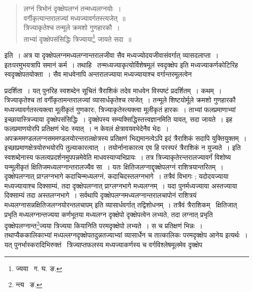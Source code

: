\documentclass[11pt, openany]{book}
\begin{document}
\begin{quote}
{\qt लग्नं त्रिभोनं दृक्क्षेपलग्नं तन्मध्यलग्नयोः~। \\
वर्गीकृत्यान्तरालज्यां मध्यज्यावर्गतस्त्यजेत्~॥ \\
त्रिज्याकृतेश्च तन्मूले क्रमशो गुणहारकौ~। \\
ताभ्यां दृक्क्षेपसंसिद्धिः त्रिज्याया\renewcommand{\thefootnote}{३}\footnote{ज्यया \textendash\ ग. घ. ङ.} जायते सदा~॥ }
\end{quote}

\noindent इति~। अत्र या दृक्क्षेपलग्नमध्यलग्नान्तरालजीवा सैव मध्यज्योदयजीवासंवर्गात् व्यासदलाप्ता~। इतःपरमुभयत्रापि समानं 
कर्म~। तथाहि \textendash\ {\qt तन्मध्यज्याकृत्योर्विशेषमूलं स्वदृक्क्षेप} इति मध्यज्याकर्णकोटिरिह स्वदृक्क्षेपतयोक्ता~। सैव माधवेनापि अन्तरालज्याया मध्यज्यायाश्च वर्गान्तरमूलत्वेन 

\newpage

\noindent प्रदर्शिता~। यत् पुनरिह स्वशब्देन सूचितं त्रैराशिकं तदेव माधवेन विस्पष्टं प्रदर्शितम्~। कथम्~। त्रिज्याकृतेश्च तां वर्गीकृतामन्तरालज्यां व्यासार्धकृतेश्च त्यजेत्~। तन्मूले शिष्टयोर्मूले क्रमशो गुणहारकौ मध्यज्यावर्गतस्त्यक्त्वा मूलीकृतं गुणकारः, त्रिज्याकृतेस्त्यक्त्वा मूलीकृतं हारकः~। ताभ्यां फलप्रमाणाभ्यां इच्छायास्त्रिज्याया दृक्क्षेपसंसिद्धिः~। दृक्क्षेपस्य सम्यक्सिद्धिस्तत्त्वज्ञानमिति यावत्, सदा जायते~। इह फलप्रमाणयोरपि प्रतिक्षणं भेदः स्यात्~। न केवलं क्षेत्रावयवभेदेनैव भेदः~। अपक्रममण्डललग्नसममण्डलयोरन्तरालक्षेत्रस्य प्रतिक्षणं भिद्यमानत्वेऽपि इदं त्रैराशिकं सदापि युक्तियुक्तम्~। इच्छाप्रमाणक्षेत्रयोरुभयोरपि तुल्याकारत्वात्~। तयोर्नानाकारत्व एव हि परस्परं त्रैराशिकं न युज्यते~। इति स्वशब्देनास्य फलत्वप्रदर्शनमुपपन्नमेवेति माधवस्याप्यभिप्रायः~। तत्र त्रिज्याकृतेरन्तरालज्यावर्गं विशोष्य यन्मूलीकृतं क्षितिजमध्यलग्नान्तरालज्यैव सा~। यतः क्षितिजलग्नाद्दृक्क्षेपलग्नं राशित्रयान्तरितम्~। दृक्क्षेपलग्नात् प्राग्लग्नभागे कदाचिन्मध्यलग्नं, कदाचिदस्तलग्नभागे~। तत्रैवं विभागः ; यदोदयज्याया मध्यज्यायाश्च दिक्साम्यं, तदा दृक्क्षेपलग्नात् प्राग्लग्नभागे मध्यलग्नम्~। यदा पुनर्मध्यज्याया अस्तज्याया दिक्साम्यं तदा अस्तलग्नभागे~। सर्वथापि दृक्क्षेपलग्नमध्यलग्नान्तरालचापोनं राशित्रयं मध्यलग्नासन्नक्षितिजलग्नयोरन्तलचापम् इति व्यासार्धवर्गात् तद्विशोधनम्~। तत्रैवं त्रैराशिकम् \textendash\ क्षितिजात् प्रभृति मध्यलग्नान्तज्यया कर्णभूतया मध्यलग्न दृक्क्षेपो दृक्क्षेपत्वेन लभ्यते, तदा लग्नात् प्रभृति दृक्क्षेपलग्नान्त\renewcommand{\thefootnote}{१}\footnote{न्त्य \textendash\ ङ.}ज्यया त्रिज्यया कियानिति परमदृक्क्षेपो लभ्यते~। स च प्रतिक्षणं भिन्नः~। तथाप्यैककालिकाभ्यां मध्पल्लग्नदृक्क्षेपतदुन्नतज्याभ्यां व्यासार्धेन च तात्कालिकः परमदृक्क्षेप आनेय इत्यर्थः~। यत् पुनर्भास्करादिभिरुक्तं \textendash\ {\qt त्रिज्याप्तफलस्य मध्यज्याकर्णस्य च वर्गविश्लेषमूलमेव दृक्क्षेप}
\end{document}
